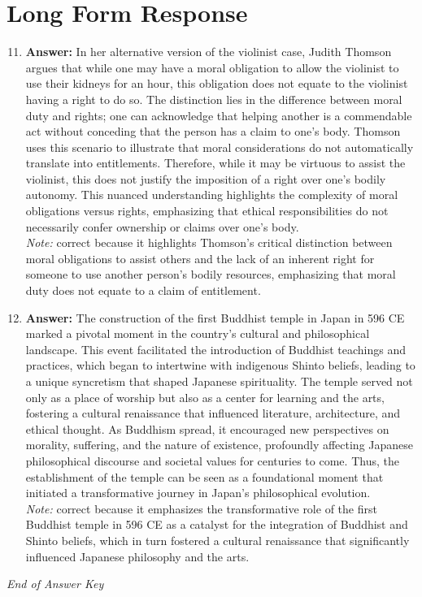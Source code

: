 \documentclass[12pt]{article}
\begin{document}
\section*{Long Form Response}
\begin{enumerate}[label=\arabic*.]
\setcounter{enumi}{10}
\item \textbf{Answer:} In her alternative version of the violinist case, Judith Thomson argues that while one may have a moral obligation to allow the violinist to use their kidneys for an hour, this obligation does not equate to the violinist having a right to do so. The distinction lies in the difference between moral duty and rights; one can acknowledge that helping another is a commendable act without conceding that the person has a claim to one's body. Thomson uses this scenario to illustrate that moral considerations do not automatically translate into entitlements. Therefore, while it may be virtuous to assist the violinist, this does not justify the imposition of a right over one's bodily autonomy. This nuanced understanding highlights the complexity of moral obligations versus rights, emphasizing that ethical responsibilities do not necessarily confer ownership or claims over one's body.
\\ \textit{Note:} correct because it highlights Thomson's critical distinction between moral obligations to assist others and the lack of an inherent right for someone to use another person's bodily resources, emphasizing that moral duty does not equate to a claim of entitlement.
\item \textbf{Answer:} The construction of the first Buddhist temple in Japan in 596 CE marked a pivotal moment in the country's cultural and philosophical landscape. This event facilitated the introduction of Buddhist teachings and practices, which began to intertwine with indigenous Shinto beliefs, leading to a unique syncretism that shaped Japanese spirituality. The temple served not only as a place of worship but also as a center for learning and the arts, fostering a cultural renaissance that influenced literature, architecture, and ethical thought. As Buddhism spread, it encouraged new perspectives on morality, suffering, and the nature of existence, profoundly affecting Japanese philosophical discourse and societal values for centuries to come. Thus, the establishment of the temple can be seen as a foundational moment that initiated a transformative journey in Japan's philosophical evolution.
\\ \textit{Note:} correct because it emphasizes the transformative role of the first Buddhist temple in 596 CE as a catalyst for the integration of Buddhist and Shinto beliefs, which in turn fostered a cultural renaissance that significantly influenced Japanese philosophy and the arts.
\end{enumerate}

\vfill
\noindent\textit{End of Answer Key}
\end{document}
